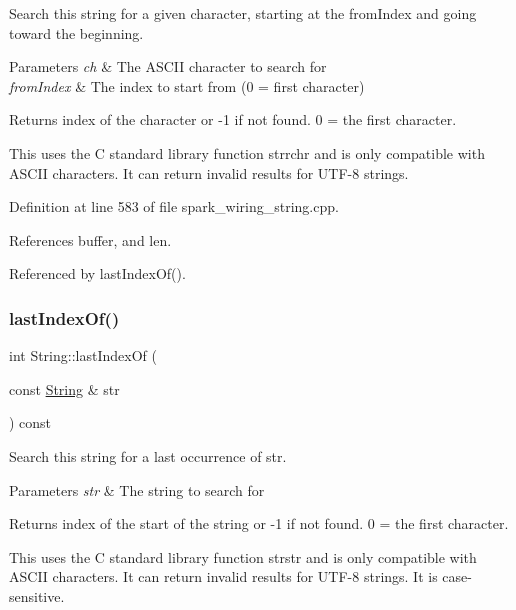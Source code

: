 Search this string for a given character, starting at the from\+Index and going toward the beginning. 


\begin{DoxyParams}{Parameters}
{\em ch} & The A\+S\+C\+II character to search for\\
\hline
{\em from\+Index} & The index to start from (0 = first character)\\
\hline
\end{DoxyParams}
\begin{DoxyReturn}{Returns}
index of the character or -\/1 if not found. 0 = the first character.
\end{DoxyReturn}
This uses the C standard library function strrchr and is only compatible with A\+S\+C\+II characters. It can return invalid results for U\+T\+F-\/8 strings. 

Definition at line 583 of file spark\+\_\+wiring\+\_\+string.\+cpp.



References buffer, and len.



Referenced by last\+Index\+Of().

\mbox{\label{class_string_aa696010f90d06e0caceeb847ab3ce689}} 
\subsubsection{\texorpdfstring{last\+Index\+Of()}{lastIndexOf()}\hspace{0.1cm}{\footnotesize\ttfamily [3/4]}}
{\footnotesize\ttfamily int String\+::last\+Index\+Of (\begin{DoxyParamCaption}\item[{const \hyperlink{class_string}{String} \&}]{str }\end{DoxyParamCaption}) const}



Search this string for a last occurrence of str. 


\begin{DoxyParams}{Parameters}
{\em str} & The string to search for\\
\hline
\end{DoxyParams}
\begin{DoxyReturn}{Returns}
index of the start of the string or -\/1 if not found. 0 = the first character.
\end{DoxyReturn}
This uses the C standard library function strstr and is only compatible with A\+S\+C\+II characters. It can return invalid results for U\+T\+F-\/8 strings. It is case-\/sensitive. 

